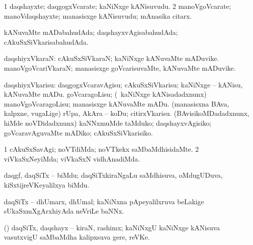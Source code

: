 {{{{{{{{{{{\bentry 
{} 
\gl{\sakirx}
\expl{}
\bmng
\emng
\eentry

\bentry
{} 
\gl{\nA}
\expl{}
\bmng
\bnum
\num{1} daqshayxte; daqgogxVcarate; kaNiNxge kANisuvudu. 
\num{2} manoVgoVcarate; manoVdaqshayxte; manasisxge kANisuvudu; mAnasika citarx. 
\enum
\emng
\eentry

\bentry
{} 
\gl{\gu}
\expl{}
\bmng
 kANuvaMte mADabahudAda; daqshayxvAgisabahudAda; cAkuSxSiVkarisabahudAda. 
\emng
\eentry

\bentry
{} 
\gl{\nA}
\expl{}
\bmng
 daqshiyxVkaraN: 
\banum
{} cAkuSxSiVkaraN; kaNiNxge kANuvaMte mADuvike. 
 manoVgoVcariVkaraN; manasisxge goVcarisuvaMte, kANuvaMte mADuvike. 
\eanum
\emng
\eentry

\bentry 
{} 
\gl{\sakirx}
\expl{}
\bmng
 daqshiyxVkarisu: 
\banum
{} daqgogxVcaravAgisu; cAkuSxSiVkarisu; kaNiNxge -- kANisu, kANuvaMte mADu. 
 goVcaragoLisu; (\kanmu\ kaNiNxge kANisadadxnunx) manoVgoVcaragoLisu; manasisxge kANuvaMte mADu. 
 (manasisxna BAva, kalpxne, \mo vugaLige) rUpa, AkAra -- koDu; citirxVkarisu. 
 (BAvisikoMDadadxnunx, hiMde noVDidadxnunx) kaNNxmuMde taMduko; daqshayxvAgisiko; goVcaravAguvaMte mADiko; cAkuSxSiVkarisiko. 
\eanum
\emng
\eentry

\bentry
{} 
\gl{\kirxvi}
\expl{}
\bmng
\bnum
\num{1} cAkuSxSavAgi; noVTdiMda; noVTkekx saMbaMdhisidaMte. 
\num{2} viVkaSxNeyiMda; viVkaSxN vidhAnadiMda. 
\enum
\emng
\eentry

\bentry 
{}
\gl{\nA}
\expl{}
\bmng
 daqgf, daqSiTx -- biMdu; daqSiTxkiraNgaLu saMdhisuva, oMdugUDuva, kiSxtijreVKeyalilxya biMdu. 
\emng
\eentry

\bentry 
{}
\gl{\nA}
\expl{}
\bmng
 daqSiTx -- dhUmarx, dhUmal; kaNiNxna pApeyalilxruva beLakige sUkaSxmXgArxhiyAda neVriLe baNNx. 
\emng
\eentry

\bentry 
{}
\gl{\nA}
\expl{}
\bmng
 (\daqvi) daqSiTx, daqshayx -- kiraN, rashimx; kaNiNxgU kaNiNxge kANisuva vasutxvigU saMbaMdha kalipxsuva gere, reVKe. 
\emng
\eentry

}}}}}}}}}}}
